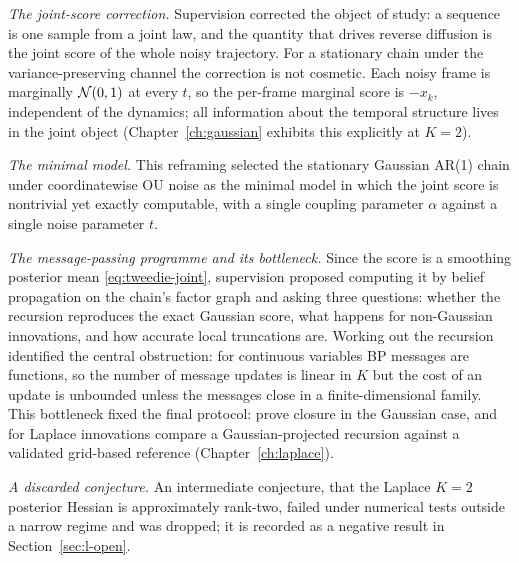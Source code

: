 \emph{The joint-score correction.} Supervision corrected the object of
study: a sequence is one sample from a joint law, and the quantity that
drives reverse diffusion is the joint score of the whole noisy trajectory.
For a stationary chain under the variance-preserving channel the
correction is not cosmetic. Each noisy frame is marginally $\mathcal{N}(0,1)$ at
every $t$, so the per-frame marginal score is $-x_k$, independent of the
dynamics; all information about the temporal structure lives in the joint
object (Chapter~\ref{ch:gaussian} exhibits this explicitly at $K=2$).

\emph{The minimal model.} This reframing selected the stationary Gaussian
AR(1) chain under coordinatewise OU noise as the minimal model in which
the joint score is nontrivial yet exactly computable, with a single
coupling parameter $\alpha$ against a single noise parameter $t$.

\emph{The message-passing programme and its bottleneck.} Since the score
is a smoothing posterior mean \eqref{eq:tweedie-joint}, supervision
proposed computing it by belief propagation on the chain's factor graph
and asking three questions: whether the recursion reproduces the exact
Gaussian score, what happens for non-Gaussian innovations, and how
accurate local truncations are. Working out the recursion identified the
central obstruction: for continuous variables BP messages are functions,
so the number of message updates is linear in $K$ but the cost of an
update is unbounded unless the messages close in a finite-dimensional
family. This bottleneck fixed the final protocol: prove closure in the
Gaussian case, and for Laplace innovations compare a Gaussian-projected
recursion against a validated grid-based reference
(Chapter~\ref{ch:laplace}).

\emph{A discarded conjecture.} An intermediate conjecture, that the
Laplace $K = 2$ posterior Hessian is approximately rank-two, failed
under numerical tests outside a narrow regime and was dropped; it is
recorded as a negative result in Section~\ref{sec:l-open}.
